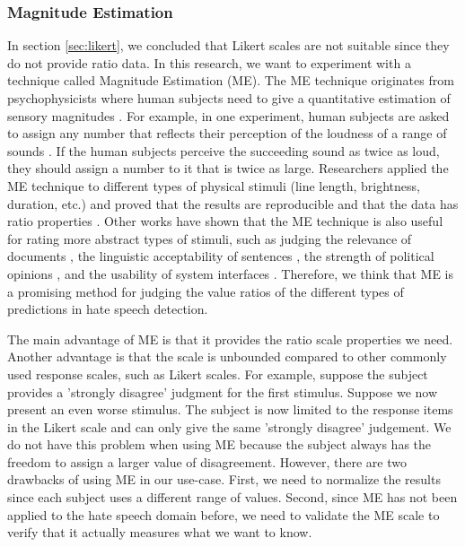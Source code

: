\subsubsection{Magnitude Estimation}
\label{sec:me}
In section \ref{sec:likert}, we concluded that Likert scales are not suitable since they do not provide ratio data.
%
In this research, we want to experiment with a technique called Magnitude Estimation (ME).
%
The ME technique originates from psychophysicists where human subjects need to give a quantitative estimation of sensory magnitudes \citep{stevens1956direct}.
%
For example, in one experiment, human subjects are asked to assign any number that reflects their perception of the loudness of a range of sounds \citep{stevens1956direct}.
%
If the human subjects perceive the succeeding sound as twice as loud, they should assign a number to it that is twice as large.
%
Researchers applied the ME technique to different types of physical stimuli (line length, brightness, duration, etc.) and proved that the results are reproducible and that the data has ratio properties \citep{moskowitz1977magnitude}.
%
Other works have shown that the ME technique is also useful for rating more abstract types of stimuli, such as judging the relevance of documents \citep{maddalena2017crowdsourcing}, the linguistic acceptability of sentences \citep{bard1996magnitude}, the strength of political opinions \citep{lodge1979comparisons, lodge1976calibration}, and the usability of system interfaces \citep{mcgee2004master}.
%
Therefore, we think that ME is a promising method for judging the value ratios of the different types of predictions in hate speech detection.
%

%
The main advantage of ME is that it provides the ratio scale properties we need.
%
Another advantage is that the scale is unbounded compared to other commonly used response scales, such as Likert scales.
%
For example, suppose the subject provides a 'strongly disagree' judgment for the first stimulus.
%
Suppose we now present an even worse stimulus.
%
The subject is now limited to the response items in the Likert scale and can only give the same 'strongly disagree' judgement.
%
We do not have this problem when using ME because the subject always has the freedom to assign a larger value of disagreement.
%
However, there are two drawbacks of using ME in our use-case.
%
First, we need to normalize the results since each subject uses a different range of values.
%
Second, since ME has not been applied to the hate speech domain before, we need to validate the ME scale to verify that it actually measures what we want to know.
%

